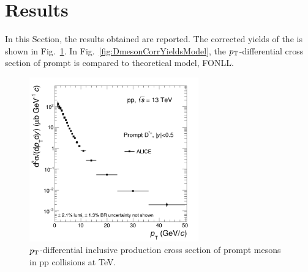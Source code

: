 \section{Results}
In this Section, the results obtained are reported. The corrected yields of the \Dstar is shown in Fig.~\ref{fig:DmesonCorrYields}. In Fig.~\ref{fig:DmesonCorrYieldsModel}, the $p_{\rm T}$-differential cross section of prompt \Dstar is compared to theoretical model, FONLL.


\begin{figure}[tb]
\begin{center}
\includegraphics[width=0.65\textwidth]{figures/Dstar/pp13TeV/cross-setion-pp13TeV.png}
\caption{$p_{\rm T}$-differential inclusive production cross section of prompt \Dstar mesons in pp collisions at  TeV.} 
\label{fig:DmesonCorrYields}
\end{center}
\end{figure}



